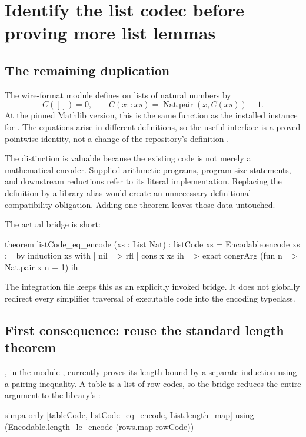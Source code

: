\section{Identify the list codec before proving more list lemmas}
\label{sec:encoding}

\subsection{The remaining duplication}

The wire-format module  defines
 on lists of natural numbers by
\[
  C([])=0,\qquad C(x::xs)=\operatorname{Nat.pair}(x,C(xs))+1.
\]
At the pinned Mathlib version, this is the same function as the installed
 instance for . The equations arise in
different definitions, so the useful interface is a proved pointwise
identity, not a change of the repository's definition \cite{codearith,mathlist}.

The distinction is valuable because the existing code is not merely a
mathematical encoder. Supplied arithmetic programs, program-size statements,
and downstream reductions refer to its literal implementation. Replacing the
definition by a library alias would create an unnecessary definitional
compatibility obligation. Adding one theorem leaves those data untouched.

The actual bridge is short:
\begin{lean}
theorem listCode_eq_encode (xs : List Nat) :
    listCode xs = Encodable.encode xs := by
  induction xs with
  | nil => rfl
  | cons x xs ih => exact congrArg (fun n => Nat.pair x n + 1) ih
\end{lean}

The integration file keeps this as an explicitly invoked bridge. It does not
globally redirect every simplifier traversal of executable code into the
encoding typeclass.

\subsection{First consequence: reuse the standard length theorem}

, in the module
, currently proves its length
bound by a separate induction using a pairing inequality. A table is a list
of row codes, so the bridge reduces the entire argument to the library's
:
\begin{lean}
  simpa only [tableCode, listCode_eq_encode, List.length_map] using
    (Encodable.length_le_encode (rows.map rowCode))
\end{lean}

